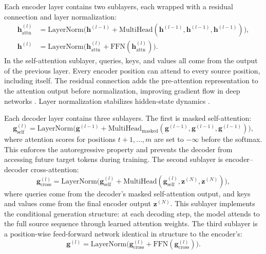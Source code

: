﻿\documentclass{article}
\begin{document}
Each encoder layer contains two sublayers, each wrapped with a residual connection and layer normalization:
\begin{align}
\mathbf{h}^{(l)}_{\text{attn}} &= \text{LayerNorm}\big(\mathbf{h}^{(l-1)} + \text{MultiHead}(\mathbf{h}^{(l-1)}, \mathbf{h}^{(l-1)}, \mathbf{h}^{(l-1)})\big), \label{eq:enc_self} \\
\mathbf{h}^{(l)} &= \text{LayerNorm}\big(\mathbf{h}^{(l)}_{\text{attn}} + \text{FFN}(\mathbf{h}^{(l)}_{\text{attn}})\big). \label{eq:enc_ffn}
\end{align}
In the self-attention sublayer, queries, keys, and values all come from the output of the previous layer. Every encoder position can attend to every source position, including itself. The residual connection adds the pre-attention representation to the attention output before normalization, improving gradient flow in deep networks \citep{he2016deep}. Layer normalization stabilizes hidden-state dynamics \citep{ba2016layer}.

Each decoder layer contains three sublayers. The first is masked self-attention:
\begin{equation}
\mathbf{g}^{(l)}_{\text{self}} = \text{LayerNorm}\big(\mathbf{g}^{(l-1)} + \text{MultiHead}_{\text{masked}}(\mathbf{g}^{(l-1)}, \mathbf{g}^{(l-1)}, \mathbf{g}^{(l-1)})\big),
\label{eq:dec_self}
\end{equation}
where attention scores for positions $t+1,\ldots,m$ are set to $-\infty$ before the softmax. This enforces the autoregressive property and prevents the decoder from accessing future target tokens during training. The second sublayer is encoder--decoder cross-attention:
\begin{equation}
\mathbf{g}^{(l)}_{\text{cross}} = \text{LayerNorm}\big(\mathbf{g}^{(l)}_{\text{self}} + \text{MultiHead}(\mathbf{g}^{(l)}_{\text{self}}, \mathbf{z}^{(N)}, \mathbf{z}^{(N)})\big),
\label{eq:dec_cross}
\end{equation}
where queries come from the decoder's masked self-attention output, and keys and values come from the final encoder output $\mathbf{z}^{(N)}$. This sublayer implements the conditional generation structure: at each decoding step, the model attends to the full source sequence through learned attention weights. The third sublayer is a position-wise feed-forward network identical in structure to the encoder's:
\begin{equation}
\mathbf{g}^{(l)} = \text{LayerNorm}\big(\mathbf{g}^{(l)}_{\text{cross}} + \text{FFN}(\mathbf{g}^{(l)}_{\text{cross}})\big).
\label{eq:dec_ffn}
\end{equation}
\end{document}
